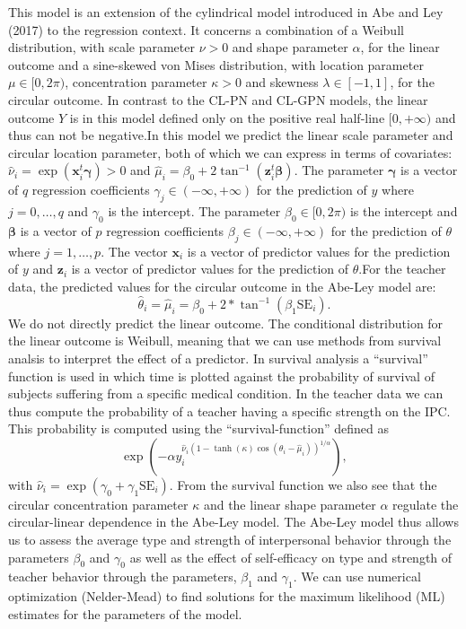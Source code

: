 \documentclass[man]{apa6}
\theoremstyle{definition}
\theoremstyle{definition}
\theoremstyle{definition}
\theoremstyle{remark}
\begin{document}
This model is an extension of the cylindrical model introduced in Abe
and Ley (2017) to the regression context. It concerns a combination of a
Weibull distribution, with scale parameter \(\nu>0\) and shape parameter
\(\alpha\), for the linear outcome and a sine-skewed von Mises
distribution, with location parameter \(\mu\in [0, 2\pi)\),
concentration parameter \(\kappa>0\) and skewness
\(\lambda \in [-1,1]\), for the circular outcome. In contrast to the
CL-PN and CL-GPN models, the linear outcome \(Y\) is in this model
defined only on the positive real half-line \([0, + \infty)\) and thus
can not be negative.\newline \indent In this model we predict the linear
scale parameter and circular location parameter, both of which we can
express in terms of covariates:
\(\hat{\nu}_i = \exp(\boldsymbol{x}_i^t\boldsymbol{\gamma}) > 0\) and
\(\hat{\mu}_i = \beta_0 + 2\tan^{-1}(\boldsymbol{z}_i^t\boldsymbol{\beta})\).
The parameter \(\boldsymbol{\gamma}\) is a vector of \(q\) regression
coefficients \(\gamma_j \in (-\infty, +\infty)\) for the prediction of
\(y\) where \(j = 0, \dots, q\) and \(\gamma_0\) is the intercept. The
parameter \(\beta_0 \in [0, 2\pi)\) is the intercept and
\(\boldsymbol{\beta}\) is a vector of \(p\) regression coefficients
\(\beta_j \in (-\infty, +\infty)\) for the prediction of \(\theta\)
where \(j = 1, \dots, p\). The vector \(\boldsymbol{x}_i\) is a vector
of predictor values for the prediction of \(y\) and \(\boldsymbol{z}_i\)
is a vector of predictor values for the prediction of
\(\theta\).\newline \indent For the teacher data, the predicted values
for the circular outcome in the Abe-Ley model are:
\[\hat{\theta}_{i} = \hat{\mu}_i = \beta_0 + 2 *
\tan^{-1}(\beta_1\text{SE}_i).\] We do not directly predict the linear
outcome. The conditional distribution for the linear outcome is Weibull,
meaning that we can use methods from survival analsis to interpret the
effect of a predictor. In survival analysis a \enquote{survival}
function is used in which time is plotted against the probability of
survival of subjects suffering from a specific medical condition. In the
teacher data we can thus compute the probability of a teacher having a
specific strength on the IPC. This probability is computed using the
\enquote{survival-function} defined as \[\exp(-\alpha
y_i^{\hat{\nu}_i(1-\tanh(\kappa)\cos(\theta_i - \hat{\mu}_i))^{1/\alpha}}),\]
with \(\hat{\nu}_i = \exp(\gamma_0 + \gamma_1\mbox{SE}_i)\). From the
survival function we also see that the circular concentration parameter
\(\kappa\) and the linear shape parameter \(\alpha\) regulate the
circular-linear dependence in the Abe-Ley model. The Abe-Ley model thus
allows us to assess the average type and strength of interpersonal
behavior through the parameters \(\beta_{0}\) and \(\gamma_0\) as well
as the effect of self-efficacy on type and strength of teacher behavior
through the parameters, \(\beta_{1}\) and \(\gamma_1\).\newline
\indent We can use numerical optimization (Nelder-Mead) to find
solutions for the maximum likelihood (ML) estimates for the parameters
of the model.
\end{document}
